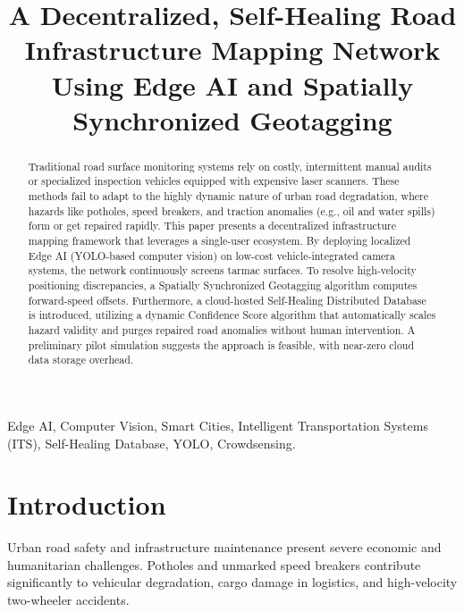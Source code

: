\documentclass[conference]{IEEEtran}
\begin{document}
\title{A Decentralized, Self-Healing Road Infrastructure Mapping Network Using Edge AI and Spatially Synchronized Geotagging}

\author{
}

\maketitle

\begin{abstract}
Traditional road surface monitoring systems rely on costly, intermittent manual audits or specialized inspection vehicles equipped with expensive laser scanners. These methods fail to adapt to the highly dynamic nature of urban road degradation, where hazards like potholes, speed breakers, and traction anomalies (e.g., oil and water spills) form or get repaired rapidly. This paper presents a decentralized infrastructure mapping framework that leverages a single-user ecosystem. By deploying localized Edge AI (YOLO-based computer vision) on low-cost vehicle-integrated camera systems, the network continuously screens tarmac surfaces. To resolve high-velocity positioning discrepancies, a Spatially Synchronized Geotagging algorithm computes forward-speed offsets. Furthermore, a cloud-hosted Self-Healing Distributed Database is introduced, utilizing a dynamic Confidence Score algorithm that automatically scales hazard validity and purges repaired road anomalies without human intervention. A preliminary pilot simulation suggests the approach is feasible, with near-zero cloud data storage overhead.
\end{abstract}

\begin{IEEEkeywords}
Edge AI, Computer Vision, Smart Cities, Intelligent Transportation Systems (ITS), Self-Healing Database, YOLO, Crowdsensing.
\end{IEEEkeywords}

\section{Introduction}

Urban road safety and infrastructure maintenance present severe economic and humanitarian challenges. Potholes and unmarked speed breakers contribute significantly to vehicular degradation, cargo damage in logistics, and high-velocity two-wheeler accidents.
\end{document}
